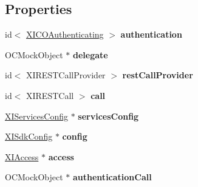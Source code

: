 \subsection*{Properties}
\begin{DoxyCompactItemize}
\item 
\hypertarget{interface_x_i_c_o_authentication_tests_a0b86412d6077e67346c2280dec427b8e}{}\label{interface_x_i_c_o_authentication_tests_a0b86412d6077e67346c2280dec427b8e} 
id$<$ \hyperlink{protocol_x_i_c_o_authenticating-p}{X\+I\+C\+O\+Authenticating} $>$ {\bfseries authentication}
\item 
\hypertarget{interface_x_i_c_o_authentication_tests_aad3652cdaf67514d460b0a1a4c3a08e7}{}\label{interface_x_i_c_o_authentication_tests_aad3652cdaf67514d460b0a1a4c3a08e7} 
O\+C\+Mock\+Object $\ast$ {\bfseries delegate}
\item 
\hypertarget{interface_x_i_c_o_authentication_tests_a4792e4e521a90637274a8f1906daca47}{}\label{interface_x_i_c_o_authentication_tests_a4792e4e521a90637274a8f1906daca47} 
id$<$ X\+I\+R\+E\+S\+T\+Call\+Provider $>$ {\bfseries rest\+Call\+Provider}
\item 
\hypertarget{interface_x_i_c_o_authentication_tests_aec9ab39b8f6aad8c62b746207495b9a1}{}\label{interface_x_i_c_o_authentication_tests_aec9ab39b8f6aad8c62b746207495b9a1} 
id$<$ X\+I\+R\+E\+S\+T\+Call $>$ {\bfseries call}
\item 
\hypertarget{interface_x_i_c_o_authentication_tests_ad1890d1753fe9bbf66a612be32312278}{}\label{interface_x_i_c_o_authentication_tests_ad1890d1753fe9bbf66a612be32312278} 
\hyperlink{interface_x_i_services_config}{X\+I\+Services\+Config} $\ast$ {\bfseries services\+Config}
\item 
\hypertarget{interface_x_i_c_o_authentication_tests_a7ceb041b59675a035a36729c0893cf18}{}\label{interface_x_i_c_o_authentication_tests_a7ceb041b59675a035a36729c0893cf18} 
\hyperlink{class_x_i_sdk_config}{X\+I\+Sdk\+Config} $\ast$ {\bfseries config}
\item 
\hypertarget{interface_x_i_c_o_authentication_tests_a7844b1a6404d9ceca997071c9db87140}{}\label{interface_x_i_c_o_authentication_tests_a7844b1a6404d9ceca997071c9db87140} 
\hyperlink{class_x_i_access}{X\+I\+Access} $\ast$ {\bfseries access}
\item 
\hypertarget{interface_x_i_c_o_authentication_tests_af33589f913832860659b34fca67bbdd6}{}\label{interface_x_i_c_o_authentication_tests_af33589f913832860659b34fca67bbdd6} 
O\+C\+Mock\+Object $\ast$ {\bfseries authentication\+Call}
\item 

\end{DoxyCompactItemize}
